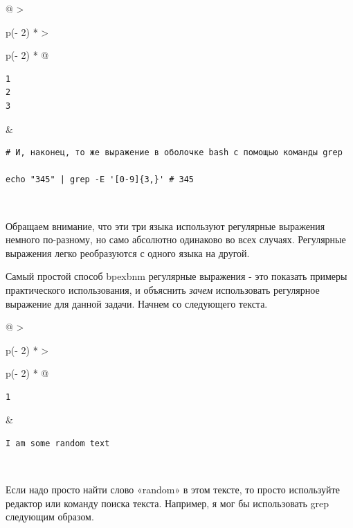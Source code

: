 \documentclass{article}
\begin{document}
\begin{longtable}[]{@{}
  >{\raggedright\arraybackslash}p{(\columnwidth - 2\tabcolsep) * }
  >{\raggedright\arraybackslash}p{(\columnwidth - 2\tabcolsep) * }@{}}
\toprule
\endhead
\begin{minipage}[t]{\linewidth}\raggedright
\begin{verbatim}
1
2
3
\end{verbatim}
\end{minipage} & \begin{minipage}[t]{\linewidth}\raggedright
\begin{verbatim}
# И, наконец, то же выражение в оболочке bash с помощью команды grep

echo "345" | grep -E '[0-9]{3,}' # 345
\end{verbatim}
\end{minipage} \\ \addlinespace
\bottomrule
\end{longtable}

Обращаем внимание, что эти три языка используют регулярные выражения
немного по-разному, но само абсолютно одинаково во всех случаях.
Регулярные выражения легко реобразуются с одного языка на другой.

Самый простой способ bpexbnm регулярные выражения - это показать примеры
практического использования, и объяснить \emph{зачем} использовать
регулярное выражение для данной задачи. Начнем со следующего текста.

\begin{longtable}[]{@{}
  >{\raggedright\arraybackslash}p{(\columnwidth - 2\tabcolsep) * }
  >{\raggedright\arraybackslash}p{(\columnwidth - 2\tabcolsep) * }@{}}
\toprule
\endhead
\begin{minipage}[t]{\linewidth}\raggedright
\begin{verbatim}
1
\end{verbatim}
\end{minipage} & \begin{minipage}[t]{\linewidth}\raggedright
\begin{verbatim}
I am some random text
\end{verbatim}
\end{minipage} \\ \addlinespace
\bottomrule
\end{longtable}

Если надо просто найти слово «random» в этом тексте, то просто
используйте редактор или команду поиска текста. Например, я мог бы
использовать grep следующим образом.
\end{document}
